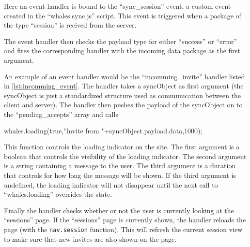 Here an event handler is bound to the ``sync\_session'' event, a custom event
created in the ``whales.sync.js'' script. This event is triggered when a
package of the type ``session'' is recived from the server.


The event handler then checks the payload type for either ``success'' or
``error'' and fires the corresponding handler with the incoming data package as
the first argument.


An example of an event handler would be the ``incomming\_invite'' handler listed
in \ref{lst:incomming_event}. The handler takes a syncObject as first argument
(the syncObject is just a standardized structure used as communication
between the client and server).
The handler then pushes the payload of the syncObject on to the
``pending\_accepts'' array and calls 

\begin{snippet}[firstnumber=3]
whales.loading(true,"Invite from "+syncObject.payload.data,1000);
\end{snippet}

This function controls the loading indicator on the site. The first argument is
a boolean that controls the visibility of the loading indicator. The second
argument is a string containing a message to the user. The third argument is a
duration that controls for how long the message will be shown. If the third
argument is undefined, the loading indicator will not disappear until the next call
to ``whales.loading'' overrides the state.


Finally the handler checks whether or not the user is currently looking at the
``sessions'' page. If the ``sessions'' page is currently shown, the
handler reloads the page (with the \lstinline$nav.session$ function). This will
refresh the current session view to make sure that new invites are also shown on
the page.
